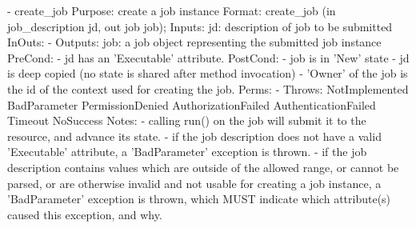 \begin{myspec}
 
    - create_job
      Purpose:  create a job instance
      Format:   create_job        (in  job_description jd,
                                   out job             job);
      Inputs:   jd:                description of job to be
                                   submitted
      InOuts:   -
      Outputs:  job:               a job object representing
                                   the submitted job instance
      PreCond:  - jd has an 'Executable' attribute.
      PostCond: - job is in 'New' state
                - jd is deep copied (no state is shared
                  after method invocation)
                - 'Owner' of the job is the id of the context
                  used for creating the job.
      Perms:    -
      Throws:   NotImplemented
                BadParameter
                PermissionDenied
                AuthorizationFailed
                AuthenticationFailed
                Timeout
                NoSuccess
      Notes:    - calling run() on the job will submit it to
                  the resource, and advance its state.
                - if the job description does not have a valid
                  'Executable' attribute, a 'BadParameter' 
                  exception is thrown.
                - if the job description contains values which
                  are outside of the allowed range, or cannot be
                  parsed, or are otherwise invalid and not
                  usable for creating a job instance, a
                  'BadParameter' exception is thrown, which MUST
                  indicate which attribute(s) caused this
                  exception, and why.
               

\end{myspec}
